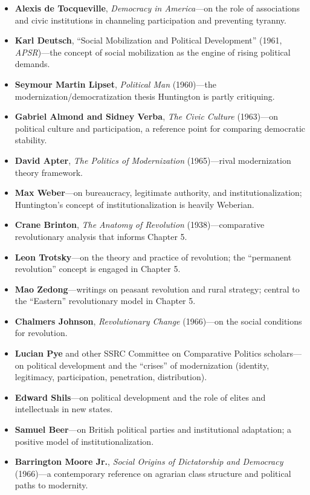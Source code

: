 \documentclass[12pt]{article}
\begin{document}
\begin{itemize}[leftmargin=*, itemsep=4pt]
    \item \textbf{Alexis de Tocqueville}, \textit{Democracy in America}---on the role of associations and civic institutions in channeling participation and preventing tyranny.
    \item \textbf{Karl Deutsch}, ``Social Mobilization and Political Development'' (1961, \textit{APSR})---the concept of social mobilization as the engine of rising political demands.
    \item \textbf{Seymour Martin Lipset}, \textit{Political Man} (1960)---the modernization/democratization thesis Huntington is partly critiquing.
    \item \textbf{Gabriel Almond and Sidney Verba}, \textit{The Civic Culture} (1963)---on political culture and participation, a reference point for comparing democratic stability.
    \item \textbf{David Apter}, \textit{The Politics of Modernization} (1965)---rival modernization theory framework.
    \item \textbf{Max Weber}---on bureaucracy, legitimate authority, and institutionalization; Huntington's concept of institutionalization is heavily Weberian.
    \item \textbf{Crane Brinton}, \textit{The Anatomy of Revolution} (1938)---comparative revolutionary analysis that informs Chapter 5.
    \item \textbf{Leon Trotsky}---on the theory and practice of revolution; the ``permanent revolution'' concept is engaged in Chapter 5.
    \item \textbf{Mao Zedong}---writings on peasant revolution and rural strategy; central to the ``Eastern'' revolutionary model in Chapter 5.
    \item \textbf{Chalmers Johnson}, \textit{Revolutionary Change} (1966)---on the social conditions for revolution.
    \item \textbf{Lucian Pye} and other SSRC Committee on Comparative Politics scholars---on political development and the ``crises'' of modernization (identity, legitimacy, participation, penetration, distribution).
    \item \textbf{Edward Shils}---on political development and the role of elites and intellectuals in new states.
    \item \textbf{Samuel Beer}---on British political parties and institutional adaptation; a positive model of institutionalization.
    \item \textbf{Barrington Moore Jr.}, \textit{Social Origins of Dictatorship and Democracy} (1966)---a contemporary reference on agrarian class structure and political paths to modernity.
\end{itemize}
\end{document}
